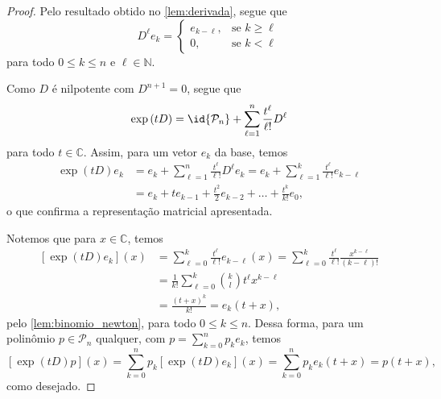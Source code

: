 \begin{proof}
    Pelo resultado obtido no \cref{lem:derivada}, segue que
    \begin{equation*}
        D^{\ell} e_k = \begin{cases}
            e_{k - \ell}, & \text{se }k\geq\ell\\
            0,&\text{se }k<\ell
        \end{cases}
    \end{equation*}
    para todo \(0 \leq k \leq n\) e \(\ell \in \mathbb{N}\).

    Como \(D\) é nilpotente com \(D^{n+1} = 0\), segue que
    \begin{equation*}
        \exp{(tD)} = \id{\mathcal{P}_n} + \sum_{\ell = 1}^{n}\frac{t^\ell}{\ell!}D^\ell
    \end{equation*}
    para todo \(t \in \mathbb{C}\). Assim, para um vetor \(e_k\) da base, temos
    \begin{align*}
        \exp{(tD)}e_k &= e_k + \sum_{\ell = 1}^n \frac{t^\ell}{\ell!}D^\ell e_k = e_k + \sum_{\ell = 1}^k \frac{t^\ell}{\ell!}e_{k-\ell}\\
                      &= e_k + t e_{k-1} + \frac{t^2}{2} e_{k-2} + \dots + \frac{t^k}{k!}e_0,
    \end{align*}
    o que confirma a representação matricial apresentada.

    Notemos que para \(x \in \mathbb{C}\), temos
    \begin{align*}
        \left[\exp{(tD)}e_k\right](x) &= \sum_{\ell=0}^k\frac{t^\ell}{\ell!}e_{k-\ell}(x) = \sum_{\ell=0}^k\frac{t^{\ell}}{\ell!}\frac{x^{k-\ell}}{(k-\ell)!}\\
                                      &= \frac{1}{k!}\sum_{\ell=0}^k \binom{k}{l} t^\ell x^{k - \ell}\\
                                      &= \frac{(t+x)^k}{k!} = e_k(t+x),
    \end{align*}
    pelo \cref{lem:binomio_newton}, para todo \(0 \leq k \leq n\). Dessa forma, para um polinômio \(p \in \mathcal{P}_n\) qualquer, com \(p = \sum_{k = 0}^n p_k e_k\), temos
    \begin{equation*}
        \left[\exp{(tD)}p\right](x) = \sum_{k = 0}^n p_k \left[\exp{(tD)}e_k\right](x) = \sum_{k = 0}^n p_k e_k(t+x) = p(t + x),
    \end{equation*}
    como desejado.
\end{proof}
